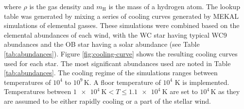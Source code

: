 \documentclass[fleqn,usenatbib]{mnras}
\newcommand{\rms}[1]{\ensuremath{_{\text{#1}}}}
\begin{document}
\noindent
where $\rho$ is the gas density and $m \rms H$ is the mass of a hydrogen atom.
The lookup table was generated by mixing a series of cooling curves generated by MEKAL simulations of elemental gasses.
These simulations were combined based on the elemental abundances of each wind, with the WC star having typical WC9 abundances and the OB star having a solar abundance (see Table \ref{tab:abundances}).
%
%
Figure \ref{fig:cooling-curve} shows the resulting cooling curves used for each star.
The most significant abundances used are noted in Table \ref{tab:abundances}.
The cooling regime of the simulations ranges between temperatures of $10^4$ to $10^9\,\si{\kelvin}$.
A floor temperature of $10^4$ \si{\kelvin} is implemented.
Temperatures between $\SI{1e4}{\kelvin} < T \leq \SI{1.1e4}{\kelvin}$ are set to $10^4\,\si{\kelvin}$ as they are assumed to be either rapidly cooling or a part of the stellar wind.
\end{document}

